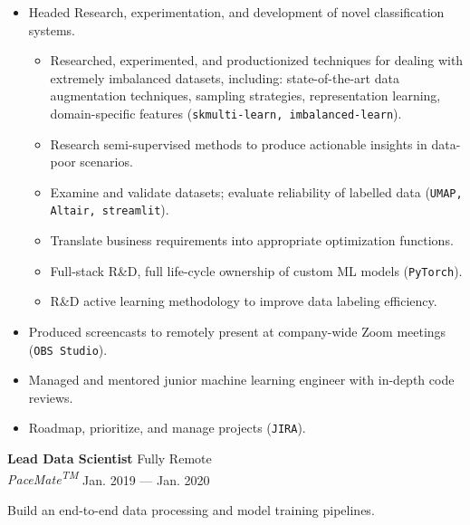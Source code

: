 \documentclass[a4paper,12pt]{article}
\newcommand{\ressubheading}[4]{{\begin{minipage}{\textwidth}
        \textbf{#1} \hfill #2 \\
        \textit{#3} \hfill #4 \\
        \end{minipage}}}
\begin{document}
\begin{itemize}
\item Headed Research, experimentation, and development of novel classification systems.
    \begin{itemize}
      \item Researched, experimented, and productionized techniques for dealing with extremely imbalanced datasets, including: state-of-the-art data augmentation techniques, sampling strategies,  representation learning, domain-specific features (\texttt{skmulti-learn, imbalanced-learn}).
      \item Research semi-supervised methods to produce actionable insights in data-poor scenarios.
	  \item Examine and validate datasets; evaluate reliability of labelled data (\texttt{UMAP, Altair, streamlit}).
	  \item Translate business requirements into appropriate optimization functions.
	  \item Full-stack R\&D, full life-cycle ownership of custom ML models (\texttt{PyTorch}).
	  \item R\&D active learning methodology to improve data labeling efficiency.
    \end{itemize}
\item Produced screencasts to remotely present at company-wide Zoom meetings (\texttt{OBS Studio}).
\item Managed and mentored junior machine learning engineer with in-depth code reviews.
\item Roadmap, prioritize, and manage projects (\texttt{JIRA}).

\end{itemize}


\ressubheading{Lead Data Scientist}{Fully Remote}{PaceMate\textsuperscript{TM}}{Jan. 2019 --- Jan. 2020}

\vspace{-6pt} Build an end-to-end data processing and model training pipelines.
\end{document}
